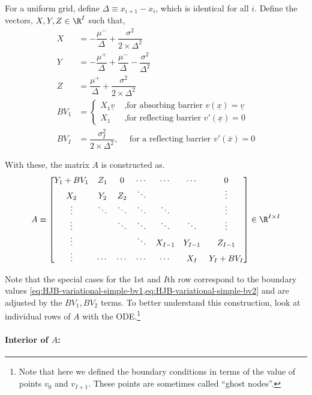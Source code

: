 \documentclass[11pt]{etk-article}
\begin{document}
For a uniform grid, define $\Delta \equiv x_{i+1} - x_i$, which is identical for all $i$.  Define the vectors, $X,Y,Z \in \R^I$ such that,
\begin{align}
	X &= - \dfrac{\mu^{-}}{\Delta} + \dfrac{\sigma^{2}}{2\times \Delta^{2}} \\
	Y &= - \dfrac{\mu^{+}}{\Delta} + \dfrac{\mu^{-}}{\Delta} - \dfrac{\sigma^{2}}{\Delta^{2}} \\
	Z &= \dfrac{\mu^{+}}{\Delta} + \dfrac{\sigma^{2}}{2\times \Delta^{2}}\\
	BV_1 &= \begin{cases} X_1 \underline{v} & \text{ ,for absorbing barrier $v(\underline{x}) = \underline{v}$}\\
	X_1& \text{ ,for reflecting barrier $v'(\underline{x}) = 0$}\end{cases}\\
	BV_I &= \dfrac{\sigma_I^2}{2\times\Delta^2}, \quad \text{ for a reflecting barrier $v'(\bar{x}) = 0$}
\end{align}


With these, the matrix $A$ is constructed as.
\begin{equation}
A \equiv \begin{bmatrix}
Y_1 + BV_1 & Z_1 & 0 & \cdots & \cdots & \cdots & 0 \\
X_2 & Y_2 & Z_2 & \ddots & & & \vdots \\
\vdots & \ddots & \ddots & \ddots & \ddots &  & \vdots \\
\vdots & &\ddots & \ddots & \ddots & \ddots  & \vdots \\
\vdots & & & \ddots & X_{I-1} & Y_{I-1}  & Z_{I-1} \\
\vdots & \cdots & \cdots & \cdots & \cdots & X_I & Y_I+BV_I\\
\end{bmatrix}\in\R^{I\times I}\label{eq:A}
\end{equation}

Note that the special cases for the $1$st and $I$th row correspond to the boundary values \cref{eq:HJB-variational-simple-bv1,eq:HJB-variational-simple-bv2} and are adjusted by the $BV_1,BV_2$ terms. To better understand this construction, look at individual rows of $A$ with the ODE.\footnote{Note that here we defined the boundary conditions in terms of the value of points $v_0$ and $v_{I+1}$. These points are sometimes called ``ghost nodes''.}

\paragraph{Interior of $A$:}
\end{document}
